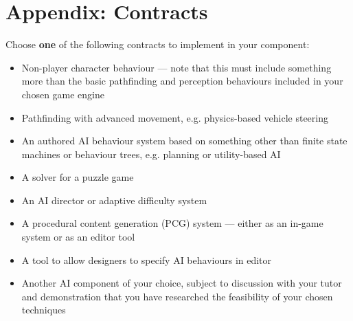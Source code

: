 \documentclass{../../fal_assignment}
\begin{document}
\section*{Appendix: Contracts}

Choose \textbf{one} of the following contracts to implement in your component:

\begin{itemize}
    \item Non-player character behaviour --- note that this must include something more than the basic pathfinding and perception behaviours included in your chosen game engine
    \item Pathfinding with advanced movement, e.g. physics-based vehicle steering
    \item An authored AI behaviour system based on something other than finite state machines or behaviour trees, e.g. planning or utility-based AI
    \item A solver for a puzzle game
    \item An AI director or adaptive difficulty system
    \item A procedural content generation (PCG) system --- either as an in-game system or as an editor tool
    \item A tool to allow designers to specify AI behaviours in editor
    \item Another AI component of your choice,
        subject to discussion with your tutor
        and demonstration that you have researched the feasibility of your chosen techniques
\end{itemize}
\end{document}
